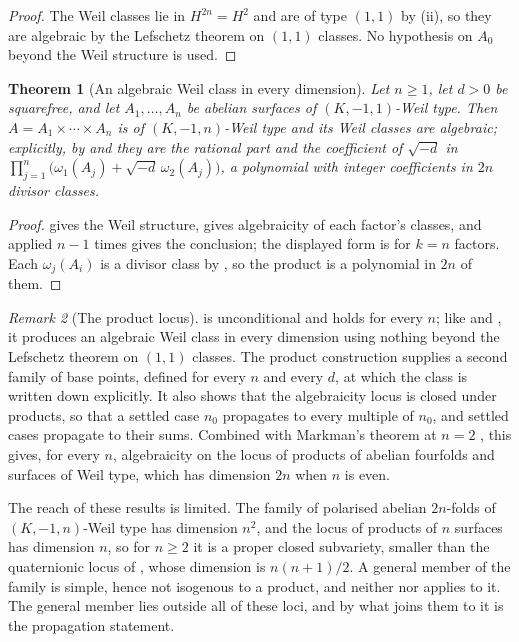 \documentclass[11pt,reqno]{amsart}
\theoremstyle{plain}
\newtheorem{theorem}{Theorem}[section]
\theoremstyle{definition}
\theoremstyle{remark}
\newtheorem{remark}[theorem]{Remark}
\begin{document}
\begin{proof}
The Weil classes lie in $H^{2n}=H^{2}$ and are of type $(1,1)$ by
(ii), so they are algebraic by the Lefschetz theorem on
$(1,1)$ classes. No hypothesis on $A_{0}$ beyond the Weil structure is used.
\end{proof}

\begin{theorem}[An algebraic Weil class in every dimension]\label{thm:everyn}
Let $n\ge1$, let $d>0$ be squarefree, and let $A_{1},\dots,A_{n}$ be abelian
surfaces of $(K,-1,1)$-Weil type. Then $A=A_{1}\times\cdots\times A_{n}$ is of
$(K,-1,n)$-Weil type and its Weil classes are algebraic; explicitly, by
 and  they are the rational part and
the coefficient of $\sqrt{-d}$ in
$\prod_{j=1}^{n}\bigl(\omega_{1}(A_{j})+\sqrt{-d}\,\omega_{2}(A_{j})\bigr)$,
a polynomial with integer coefficients in $2n$ divisor classes.
\end{theorem}

\begin{proof}
 gives the Weil structure,  gives
algebraicity of each factor's classes, and  applied $n-1$
times gives the conclusion; the displayed form is  for $k=n$
factors. Each $\omega_{j}(A_{i})$ is a divisor class by
, so the product is a polynomial in $2n$ of them.
\end{proof}

\begin{remark}[The product locus]\label{rem:prodscope}
 is unconditional and holds for every $n$; like
 and , it produces an algebraic
Weil class in every dimension using nothing beyond the Lefschetz theorem on
$(1,1)$ classes. The product construction supplies a second family of base
points, defined for every $n$ and every $d$, at which the class is written
down explicitly. It also shows that the algebraicity locus is closed under
products, so that a settled case $n_{0}$ propagates to every multiple of
$n_{0}$, and settled cases propagate to their sums. Combined with Markman's
theorem at $n=2$ \cite{Mar25a,Mar25b}, this gives, for every $n$,
algebraicity on the locus of products of abelian fourfolds and surfaces of
Weil type, which has dimension $2n$ when $n$ is even.

The reach of these results is limited. The family of polarised abelian
$2n$-folds of $(K,-1,n)$-Weil type has dimension $n^{2}$, and the locus of
products of $n$ surfaces has dimension $n$, so for $n\ge2$ it is a proper
closed subvariety, smaller than the quaternionic locus of ,
whose dimension is $n(n+1)/2$. A general member of the family is simple,
hence not isogenous to a product, and neither  nor
 applies to it. The general member lies outside all
of these loci, and by  what joins them to it is the
propagation statement.
\end{remark}
\end{document}
